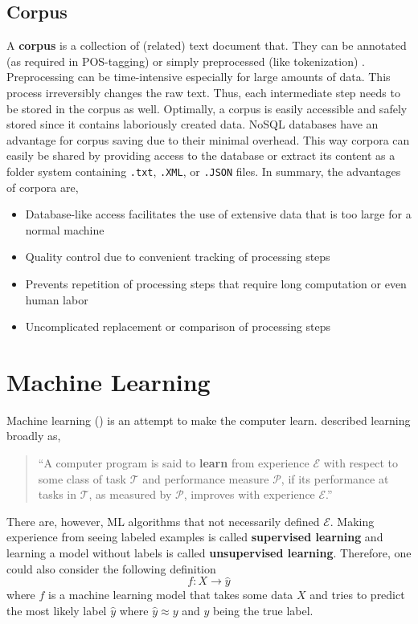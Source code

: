 \subsection{Corpus}
A \textbf{corpus} is a collection of (related) text document that. They can be annotated (as required in POS-tagging) or simply preprocessed (like tokenization) \citep{Bengfort2018}.
Preprocessing can be time-intensive especially for large amounts of data. This process irreversibly changes the raw text. Thus, each intermediate step needs to be stored in the corpus as well.
Optimally, a corpus is easily accessible and safely stored since it contains laboriously created data. NoSQL databases have an advantage for corpus saving due to their minimal overhead.
This way corpora can easily be shared by providing access to the database or extract its content as a folder system containing \texttt{.txt}, \texttt{.XML}, or \texttt{.JSON} files.
In summary, the advantages of corpora  are,
\begin{itemize}
  \item Database-like access facilitates the use of extensive data that is too large for a normal machine
  \item Quality control due to convenient tracking of processing steps
  \item Prevents repetition of processing steps that require long computation or even human labor
  \item Uncomplicated replacement or comparison of processing steps
\end{itemize}

\section{Machine Learning}
Machine learning () is an attempt to make the computer learn. \citeauthor{Mitchell1997} described learning broadly as,
%
\begin{quote}
``A computer program is said to \textbf{learn} from experience $\mathcal{E}$ with respect to some class of task $\mathcal{T}$ and performance measure $\mathcal{P}$, if its performance at tasks in $\mathcal{T}$, as measured by $\mathcal{P}$, improves with experience $\mathcal{E}$.''
\end{quote}
%
There are, however, ML algorithms that not necessarily defined $\mathcal{E}$. Making experience from seeing labeled examples is called \textbf{supervised learning} and learning a model without labels is called \textbf{unsupervised learning}. Therefore, one could also consider the following definition  \[f: X \rightarrow \hat{y}\] where $f$ is a machine learning model that takes some data $X$ and tries to predict the most likely label $\hat{y}$ where $\hat{y} \approx y$ and $y$ being the true label.

